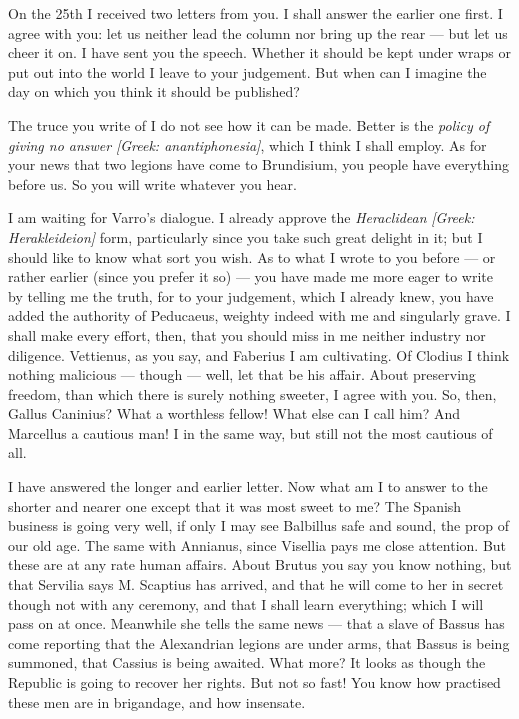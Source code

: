 

 On the 25th I received two letters from you. I shall answer the earlier one first. I agree with you: let us neither lead the column nor bring up the rear --- but let us cheer it on. I have sent you the speech. Whether it should be kept under wraps or put out into the world I leave to your judgement. But when can I imagine the day on which you think it should be published?

 The truce you write of I do not see how it can be made. Better is the \textit{policy of giving no answer} \textit{[Greek: anantiphonesia]}, which I think I shall employ. As for your news that two legions have come to Brundisium, you people have everything before us. So you will write whatever you hear.

 I am waiting for Varro's dialogue. I already approve the \textit{Heraclidean} \textit{[Greek: Herakleideion]} form, particularly since you take such great delight in it; but I should like to know what sort you wish. As to what I wrote to you before --- or rather earlier (since you prefer it so) --- you have made me more eager to write \dag by telling me the truth, \dag for to your judgement, which I already knew, you have added the authority of Peducaeus, weighty indeed with me and singularly grave. I shall make every effort, then, that you should miss in me neither industry nor diligence. Vettienus, as you say, and Faberius I am cultivating. Of Clodius I think nothing malicious --- though --- well, let that be his affair. About preserving freedom, than which there is surely nothing sweeter, I agree with you. So, then, Gallus Caninius? What a worthless fellow! What else can I call him? And Marcellus a cautious man! I in the same way, but still not the most cautious of all.

 I have answered the longer and earlier letter. Now what am I to answer to the shorter and nearer one except that it was most sweet to me? The Spanish business is going very well, if only I may see Balbillus safe and sound, the prop of our old age. The same with Annianus, since Visellia pays me close attention. But these are at any rate human affairs. About Brutus you say you know nothing, but that Servilia says M. Scaptius has arrived, and that he will come to her in secret \dag though not with any ceremony, \dag and that I shall learn everything; which I will pass on at once. Meanwhile she tells the same news --- that a slave of Bassus has come reporting that the Alexandrian legions are under arms, that Bassus is being summoned, that Cassius is being awaited. What more? It looks as though the Republic is going to recover her rights. But not so fast! You know how practised these men are in brigandage, and how insensate.

